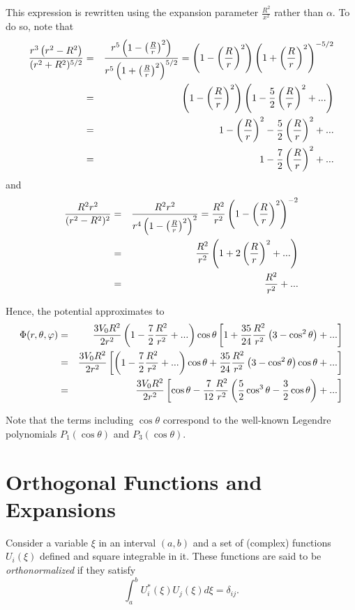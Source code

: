 This expression is rewritten using the expansion parameter $\frac{R^2}{x^2}$ rather than $\alpha$. To do so, note that
\begin{eqnarray}
\frac{r^3  \left(  r^2- R^2 \right)}{(r^2 + R^2)^{5/2}} &=& \frac{r^5  \left(  1- \left(\frac{R}{r} \right)^2 \right)}{r^5 \left( 1 + \left(\frac{R}{r} \right)^2 \right)^{5/2}} =  \left(  1- \left(\frac{R}{r} \right)^2 \right) \left( 1 + \left(\frac{R}{r} \right)^2 \right)^{-5/2} \notag \\
&=&  \left(  1- \left(\frac{R}{r} \right) ^2 \right) \left( 1 - \frac{5}{2} \left(\frac{R}{r} \right)^2 +...\right) \notag \\
&=&  1 - \left(\frac{R}{r} \right) ^2  - \frac{5}{2} \left(\frac{R}{r} \right)^2 +... \notag \\
&=&  1 -\frac{7}{2} \left(\frac{R}{r} \right)^2 +...
\end{eqnarray}
and
\begin{eqnarray}
\frac{R^2 r^2}{(r^2 - R^2)^2} &=& \frac{R^2 r^2}{r^4\left( 1 - \left( \frac{R}{r} \right)^2 \right)^2} = \frac{R^2 }{r^2 } \left( 1 - \left( \frac{R}{r} \right)^2 \right)^{-2} \notag \\
&=& \frac{R^2 }{r^2 } \left( 1 +2 \left( \frac{R}{r} \right)^2 + ... \right) \notag \\
&=& \frac{R^2 }{r^2 } + ...
\end{eqnarray}

Hence, the potential approximates to
\begin{eqnarray}
\Phi (r, \theta, \varphi ) &=& \frac{3V_0 R^2}{2 r^2}  \left( 1 -\frac{7}{2} \frac{R^2}{r^2}  +... \right) \cos \theta \left[  1 +  \frac{35}{24}  \frac{R^2 }{r^2 } \left( 3 - \cos ^2 \theta \right) + ... \right] \notag \\
 &=& \frac{3V_0 R^2}{2 r^2}  \left[   \left( 1 -\frac{7}{2} \frac{R^2}{r^2} +... \right) \cos \theta +  \frac{35}{24}  \frac{R^2 }{r^2 } \left( 3 - \cos ^2 \theta \right) \cos \theta + ... \right] \notag \\
 &=& \frac{3V_0 R^2}{2 r^2}  \left[  \cos \theta - \frac{7}{12} \frac{R^2}{r^2}   \left(  \frac{5}{2} \cos ^3 \theta - \frac{3}{2} \cos \theta  \right) + ... \right]
\end{eqnarray}

Note that the terms including $\cos \theta$ correspond to the well-known Legendre polynomials  $P_1(\cos \theta)$ and  $P_3(\cos \theta)$.

\section{Orthogonal Functions and Expansions}
Consider a variable $\xi$ in an interval $(a,b)$ and a set of (complex) functions $ U_i (\xi) $ defined and square integrable in it. These functions are said to be \textit{orthonormalized} if they satisfy
\begin{equation}
\int_a^b U_i ^* (\xi ) U_j  (\xi ) d\xi = \delta_{ij}.
\end{equation}

